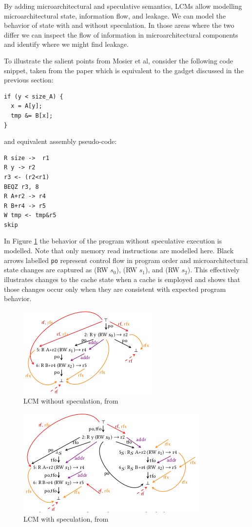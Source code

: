 \documentclass[11pt,conference]{IEEEtran}
\begin{document}
By adding microarchitectural and speculative semantics, LCMs allow modelling microarchitectural state, information flow, and leakage.
We can model the behavior of state with and without speculation.
In those areas where the two differ we can inspect the flow of information in microarchitectural components and identify where we might find leakage.

To illustrate the salient points from Mosier et al, consider the following code snippet, taken from the paper which is equivalent to the gadget discussed in the previous section:
\begin{lstlisting}
if (y < size_A) {
  x = A[y];
  tmp &= B[x];
}
\end{lstlisting}
and equivalent assembly pseudo-code:
\begin{lstlisting}
R size ->  r1
R y -> r2
r3 <- (r2<r1)
BEQZ r3, 8
R A+r2 -> r4
R B+r4 -> r5
W tmp <- tmp&r5
skip
\end{lstlisting}

In Figure \ref{fig:lcm1} the behavior of the program without speculative execution is modelled.
Note that only memory read instructions are modelled here.
Black arrows labelled \texttt{po} represent control flow in program order and microarchitectural state changes are captured as (RW $s_0$), (RW $s_1$), and (RW $s_2$).
This effectively illustrates changes to the cache state when a cache is employed and shows that those changes occur only when they are consistent with expected program behavior.

\begin{figure}[t]
  \centering
  \includegraphics[width=0.6\linewidth]{lcm1}
	\caption{LCM without speculation, from \cite{mosier2022}}
  \label{fig:lcm1}
\end{figure}
\begin{figure}[t]
  \includegraphics[width=0.8\linewidth]{lcm2}
	\caption{LCM with speculation, from \cite{mosier2022}}
  \label{fig:lcm2}
\end{figure}
\end{document}
